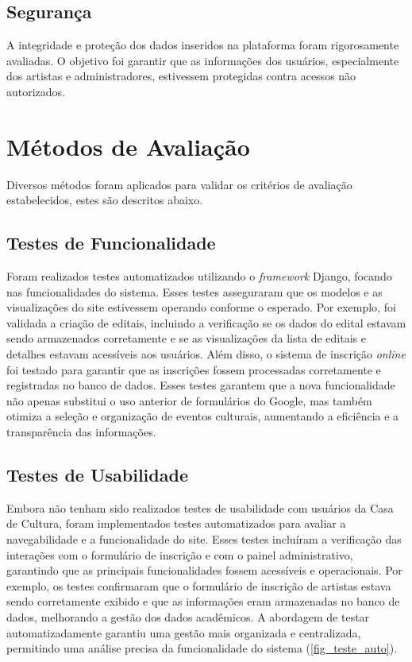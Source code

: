 \subsection{Segurança} 
A integridade e proteção dos dados inseridos na plataforma foram rigorosamente avaliadas. O objetivo foi garantir que as informações dos usuários, especialmente dos artistas e administradores, estivessem protegidas contra acessos não autorizados.

\section{Métodos de Avaliação}

Diversos métodos foram aplicados para validar os critérios de avaliação estabelecidos, estes são descritos abaixo.

\subsection{Testes de Funcionalidade} 

Foram realizados testes automatizados utilizando o \textit{framework} Django, focando nas funcionalidades do sistema. Esses testes asseguraram que os modelos e as visualizações do site estivessem operando conforme o esperado. Por exemplo, foi validada a criação de editais, incluindo a verificação se os dados do edital estavam sendo armazenados corretamente e se as visualizações da lista de editais e detalhes estavam acessíveis aos usuários. Além disso, o sistema de inscrição \textit{online} foi testado para garantir que as inscrições fossem processadas corretamente e registradas no banco de dados. Esses testes garantem que a nova funcionalidade não apenas substitui o uso anterior de formulários do Google, mas também otimiza a seleção e organização de eventos culturais, aumentando a eficiência e a transparência das informações.

\subsection{Testes de Usabilidade}

Embora não tenham sido realizados testes de usabilidade com usuários da Casa de Cultura, foram implementados testes automatizados para avaliar a navegabilidade e a funcionalidade do site. Esses testes incluíram a verificação das interações com o formulário de inscrição e com o painel administrativo, garantindo que as principais funcionalidades fossem acessíveis e operacionais. Por exemplo, os testes confirmaram que o formulário de inscrição de artistas estava sendo corretamente exibido e que as informações eram armazenadas no banco de dados, melhorando a gestão dos dados acadêmicos. A abordagem de testar automatizadamente garantiu uma gestão mais organizada e centralizada, permitindo uma análise precisa da funcionalidade do sistema (\autoref{fig_teste_auto}).

